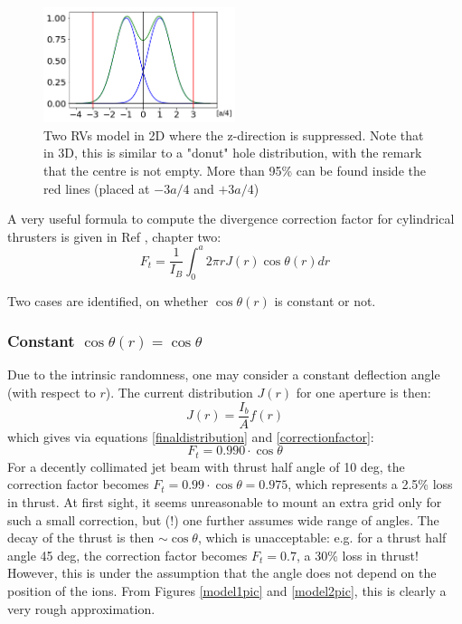 \documentclass[twocolumn,12pt]{article}
\numberwithin{equation}{section} %
\numberwithin{equation}{section}
\begin{document}
\begin{figure}[H]
    \centering
    \includegraphics[width=0.5\textwidth]{figs/twogaussians.png}
    \caption{Two RVs model in 2D where the z-direction is suppressed. Note that in 3D, this is similar to a "donut" hole distribution, with the remark that the centre is not empty.  More than 95\% can be found inside the red lines (placed at $-3a/4$ and $+3a/4$) }
    \label{RVdistribution}
\end{figure}

A very useful formula to compute the divergence correction factor for cylindrical thrusters is given in Ref \cite{fundamentalsofelectricpropulsion}, chapter two:
\begin{equation}
    F_t = \frac{1}{I_B}\int_0^a  2 \pi r J(r) \cos \theta(r) dr
    \label{correctionfactor}
\end{equation}

Two cases are identified, on whether $\cos \theta(r)$ is constant or not. 


\subsubsection{Constant $\cos \theta (r) = \cos \theta$}
Due to the intrinsic randomness, one may consider a constant deflection angle (with respect to $r$). The current distribution $J(r)$ for one aperture is then:
\begin{equation}
    J(r) = \dfrac{I_b}{A} f(r)
\end{equation}
which gives via equations \ref{finaldistribution} and \ref{correctionfactor}:
\begin{equation}
    F_t =  0.990 \cdot \cos \theta
    \label{constantthetasolution}
\end{equation}
For a decently collimated jet beam with thrust half angle of 10 deg, the correction factor becomes $F_t = 0.99 \cdot \cos\theta = 0.975$, which represents a 2.5\% loss in thrust. At first sight, it seems unreasonable to mount an extra grid only for such a small correction, but (!) one further assumes wide range of angles. The decay of the thrust is then $\sim \cos \theta$, which is unacceptable: e.g. for a thrust half angle 45 deg, the correction factor becomes $F_t = 0.7$, a 30\% loss in thrust! However, this is under the assumption that the angle does not depend on the position of the ions. From Figures \ref{model1pic} and \ref{model2pic}, this is clearly a very rough approximation.
\end{document}
